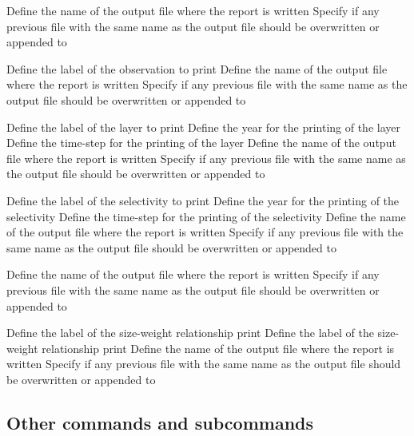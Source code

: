  {Define the name of the output file where the report is written}
 {Specify if any previous file with the same name as the output file should be overwritten or appended to}
\par\textbf{}\par
{} {Define the label of the observation to print}
 {Define the name of the output file where the report is written}
 {Specify if any previous file with the same name as the output file should be overwritten or appended to}
\par\textbf{}\par
{} {Define the label of the layer to print}
 {Define the year for the printing of the layer}
 {Define the time-step for the printing of the layer}
 {Define the name of the output file where the report is written}
 {Specify if any previous file with the same name as the output file should be overwritten or appended to}
\par\textbf{}\par
{} {Define the label of the selectivity to print}
 {Define the year for the printing of the selectivity}
 {Define the time-step for the printing of the selectivity}
 {Define the name of the output file where the report is written}
 {Specify if any previous file with the same name as the output file should be overwritten or appended to}
\par\textbf{}\par
{} {Define the name of the output file where the report is written}
 {Specify if any previous file with the same name as the output file should be overwritten or appended to}
\par\textbf{}\par
{} {Define the label of the size-weight relationship print}
 {Define the label of the size-weight relationship print}
 {Define the name of the output file where the report is written}
 {Specify if any previous file with the same name as the output file should be overwritten or appended to}
\subsection{Other commands and subcommands}\par
{}\par\par
